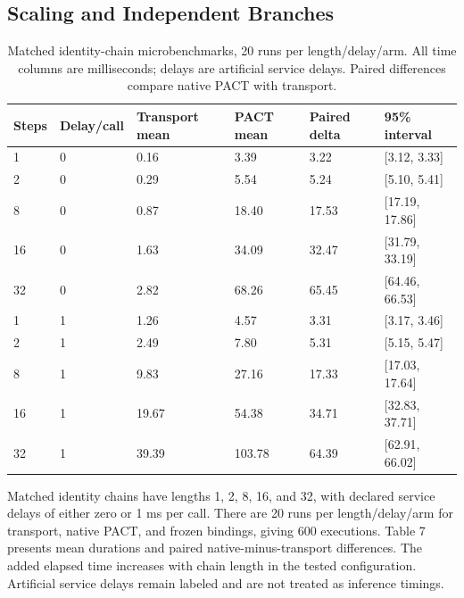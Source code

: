 \documentclass[10pt,twocolumn,a4paper]{article}
\begin{document}
\subsection{Scaling and Independent Branches}

\begin{table}[t]
\centering
\caption{Matched identity-chain microbenchmarks, 20 runs per length/delay/arm. All time columns are milliseconds; delays are artificial service delays. Paired differences compare native PACT with transport.}
\label{tab:scaling-extended}
\small
\setlength{\tabcolsep}{4pt}
\renewcommand{\arraystretch}{1.12}
\begin{tabularx}{\textwidth}{@{}Xlllll@{}}
\toprule
Steps & Delay/call & Transport mean & PACT mean & Paired delta & 95\% interval\\
\midrule
1 & 0 & 0.16 & 3.39 & 3.22 & [3.12, 3.33]\\
2 & 0 & 0.29 & 5.54 & 5.24 & [5.10, 5.41]\\
8 & 0 & 0.87 & 18.40 & 17.53 & [17.19, 17.86]\\
16 & 0 & 1.63 & 34.09 & 32.47 & [31.79, 33.19]\\
32 & 0 & 2.82 & 68.26 & 65.45 & [64.46, 66.53]\\
1 & 1 & 1.26 & 4.57 & 3.31 & [3.17, 3.46]\\
2 & 1 & 2.49 & 7.80 & 5.31 & [5.15, 5.47]\\
8 & 1 & 9.83 & 27.16 & 17.33 & [17.03, 17.64]\\
16 & 1 & 19.67 & 54.38 & 34.71 & [32.83, 37.71]\\
32 & 1 & 39.39 & 103.78 & 64.39 & [62.91, 66.02]\\
\bottomrule
\end{tabularx}
\end{table}
Matched identity chains have lengths 1, 2, 8, 16, and 32, with declared service delays of either zero or 1 ms per call. There are 20 runs per length/delay/arm for transport, native PACT, and frozen bindings, giving 600 executions. Table 7 presents mean durations and paired native-minus-transport differences. The added elapsed time increases with chain length in the tested configuration. Artificial service delays remain labeled and are not treated as inference timings.
\end{document}
